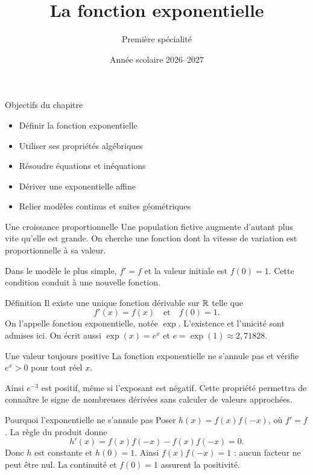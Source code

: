 \documentclass[aspectratio=169,12pt]{beamer}
\title{La fonction exponentielle}
\subtitle{Première spécialité}
\date{Année scolaire 2026--2027}
\begin{document}
\begin{frame}\titlepage\end{frame}
\begin{frame}{Objectifs du chapitre}\begin{itemize}
\item Définir la fonction exponentielle
\item Utiliser ses propriétés algébriques
\item Résoudre équations et inéquations
\item Dériver une exponentielle affine
\item Relier modèles continus et suites géométriques
\end{itemize}\end{frame}
\renewcommand{\slidekind}{COMPRENDRE}
\begin{frame}[t,fragile]{Une croissance proportionnelle}
Une population fictive augmente d’autant plus vite qu’elle est grande. On cherche une fonction dont la vitesse de variation est proportionnelle à sa valeur.\medskip\par Dans le modèle le plus simple, $f\prime=f$ et la valeur initiale est $f(0)=1$. Cette condition conduit à une nouvelle fonction.
\end{frame}
\renewcommand{\slidekind}{COMPRENDRE}
\begin{frame}[t,fragile]{Définition}
Il existe une unique fonction dérivable sur $\mathbb{R}$ telle que\[f\prime(x)=f(x)\quad\text{et}\quad f(0)=1.\] On l’appelle fonction exponentielle, notée $\exp$. L’existence et l’unicité sont admises ici. On écrit aussi $\exp(x)=e^x$ et $e=\exp(1)\approx2,71828$.
\end{frame}
\renewcommand{\slidekind}{COMPRENDRE}
\begin{frame}[t,fragile]{Une valeur toujours positive}
La fonction exponentielle ne s’annule pas et vérifie $e^x>0$ pour tout réel $x$.\medskip\par Ainsi $e^{-3}$ est positif, même si l’exposant est négatif. Cette propriété permettra de connaître le signe de nombreuses dérivées sans calculer de valeurs approchées.
\end{frame}
\renewcommand{\slidekind}{JUSTIFIER}
\begin{frame}[t,fragile]{Pourquoi l’exponentielle ne s’annule pas}
Poser $h(x)=f(x)f(-x)$, où $f\prime=f$. La règle du produit donne\[h\prime(x)=f(x)f(-x)-f(x)f(-x)=0.\] Donc $h$ est constante et $h(0)=1$. Ainsi $f(x)f(-x)=1$ : aucun facteur ne peut être nul. La continuité et $f(0)=1$ assurent la positivité.
\end{frame}
\end{document}
